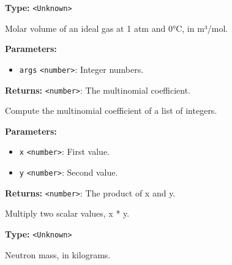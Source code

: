 \documentclass[12pt,a4paper]{article}
\begin{document}
\vspace{5mm}
\noindent {}\vspace{4mm}


\noindent \textbf{Type:} \texttt{<Unknown>}

\noindent Molar volume of an ideal gas at 1 atm and 0°C, in m³/mol.

\vspace{5mm}
\noindent {}


\noindent \textbf{Parameters:}
\begin{itemize}
  \item \texttt{args} \texttt{<number>}: Integer numbers.
\end{itemize}

\noindent \textbf{Returns:} \texttt{<number>}: The multinomial coefficient.

\noindent Compute the multinomial coefficient of a list of integers.

\vspace{5mm}
\noindent {}


\noindent \textbf{Parameters:}
\begin{itemize}
  \item \texttt{x} \texttt{<number>}: First value.
  \item \texttt{y} \texttt{<number>}: Second value.
\end{itemize}

\noindent \textbf{Returns:} \texttt{<number>}: The product of x and y.

\noindent Multiply two scalar values, x * y.

\vspace{5mm}
\noindent {}\vspace{4mm}


\noindent \textbf{Type:} \texttt{<Unknown>}

\noindent Neutron mass, in kilograms.

\vspace{5mm}
\noindent {}
\end{document}
